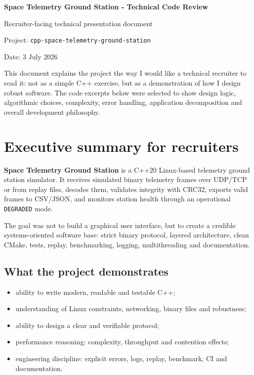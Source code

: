 \documentclass[10pt,a4paper]{article}
\begin{document}
\begin{titlepage}
\centering
\vspace*{2.5cm}
{\Huge\bfseries Space Telemetry Ground Station - Technical Code Review\par}
\vspace{0.5cm}
{\Large Recruiter-facing technical presentation document\par}
\vspace{1.5cm}
{\large Project: \texttt{cpp-space-telemetry-ground-station}\par}
\vspace{0.4cm}
{\large Date: 3 July 2026\par}
\vfill
\begin{minipage}{0.82\textwidth}
\small

This document explains the project the way I would like a technical recruiter to read it: not as a simple C++ exercise, but as a demonstration of how I design robust software. The code excerpts below were selected to show design logic, algorithmic choices, complexity, error handling, application decomposition and overall development philosophy.
\end{minipage}
\vfill
\end{titlepage}
\tableofcontents
\newpage

\section{Executive summary for recruiters}

\textbf{Space Telemetry Ground Station} is a C++20 Linux-based telemetry ground station simulator. It receives simulated binary telemetry frames over UDP/TCP or from replay files, decodes them, validates integrity with CRC32, exports valid frames to CSV/JSON, and monitors station health through an operational \texttt{DEGRADED} mode.

The goal was not to build a graphical user interface, but to create a credible systems-oriented software base: strict binary protocol, layered architecture, clean CMake, tests, replay, benchmarking, logging, multithreading and documentation.

\subsection{What the project demonstrates}
\begin{itemize}
  \item ability to write modern, readable and testable C++;
  \item understanding of Linux constraints, networking, binary files and robustness;
  \item ability to design a clear and verifiable protocol;
  \item performance reasoning: complexity, throughput and contention effects;
  \item engineering discipline: explicit errors, logs, replay, benchmark, CI and documentation.
\end{itemize}
\end{document}
